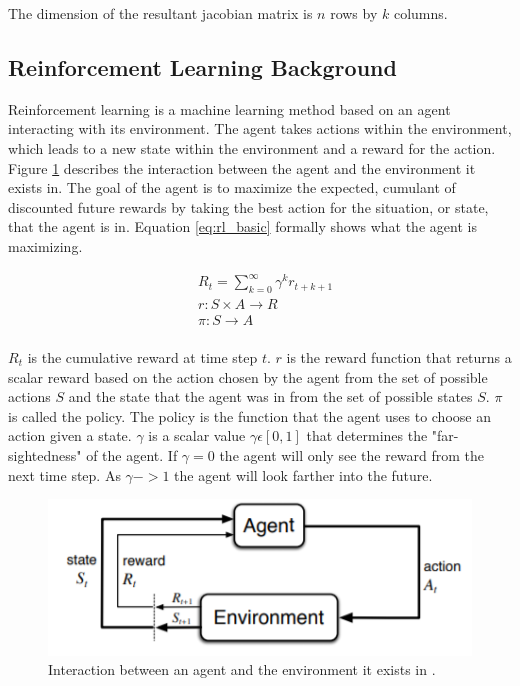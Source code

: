 \documentclass[letterpaper,12pt]{article}
\begin{document}
The dimension of the resultant jacobian matrix is $n$ rows by $k$ columns.

\subsection{Reinforcement Learning Background}
Reinforcement learning is a machine learning method based on an agent interacting with its environment. The agent takes actions within the environment, which leads to a new state within the environment and a reward for the action. Figure \ref{fig:rl_diagram} describes the interaction between the agent and the environment it exists in.
The goal of the agent is to maximize the expected, cumulant of discounted future rewards by taking the best action for the situation, or state, that the agent is in. Equation \ref{eq:rl_basic} formally shows what the agent is maximizing.

\begin{equation}
\begin{split}
	\label{eq:rl_basic}
	& R_t = \sum_{k=0}^{\infty}\gamma^kr_{t+k+1} \\
	& r:S \times A \rightarrow R \\
	& \pi: S \rightarrow A \\
\end{split}
\end{equation}

$R_t$ is the cumulative reward at time step $t$. $r$ is the reward function that returns a scalar reward based on the action chosen by the agent from the set of possible actions $S$ and the state that the agent was in from the set of possible states $S$. $\pi$ is called the policy. The policy is the function that the agent uses to choose an action given a state. $\gamma$ is a scalar value $\gamma \epsilon[0, 1]$ that determines the "far-sightedness" of the agent. If $\gamma=0$ the agent will only see the reward from the next time step. As $\gamma -> 1$ the agent will look farther into the future.

\begin{figure}[H]
\centering \includegraphics[width=0.8\columnwidth]{rl_diagram.png}
\caption{\label{fig:rl_diagram}Interaction between an agent and the environment it exists in \cite{r.s.sutton}.}
\end{figure}
\end{document}
